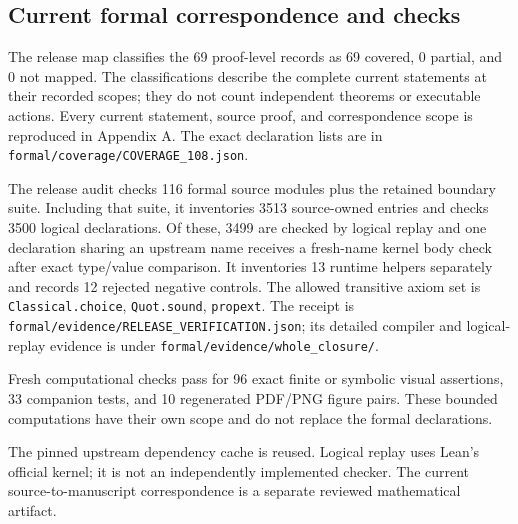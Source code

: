\subsection{Current formal correspondence and checks}
The release map classifies the 69 proof-level records as 69 covered, 0 partial, and 0 not mapped. The classifications describe the complete current statements at their recorded scopes; they do not count independent theorems or executable actions. Every current statement, source proof, and correspondence scope is reproduced in Appendix A. The exact declaration lists are in \nolinkurl{formal/coverage/COVERAGE_108.json}.

The release audit checks 116 formal source modules plus the retained boundary suite. Including that suite, it inventories 3513 source-owned entries and checks 3500 logical declarations. Of these, 3499 are checked by logical replay and one declaration sharing an upstream name receives a fresh-name kernel body check after exact type/value comparison. It inventories 13 runtime helpers separately and records 12 rejected negative controls. The allowed transitive axiom set is \nolinkurl{Classical.choice}, \nolinkurl{Quot.sound}, \nolinkurl{propext}. The receipt is \nolinkurl{formal/evidence/RELEASE_VERIFICATION.json}; its detailed compiler and logical-replay evidence is under \nolinkurl{formal/evidence/whole_closure/}.

Fresh computational checks pass for 96 exact finite or symbolic visual assertions, 33 companion tests, and 10 regenerated PDF/PNG figure pairs. These bounded computations have their own scope and do not replace the formal declarations.

The pinned upstream dependency cache is reused. Logical replay uses Lean's official kernel; it is not an independently implemented checker. The current source-to-manuscript correspondence is a separate reviewed mathematical artifact.

